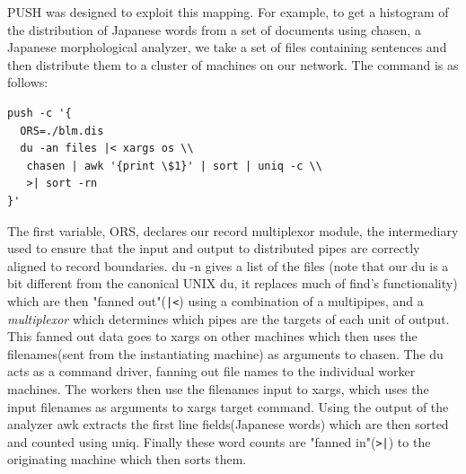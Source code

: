 PUSH was designed to exploit this mapping. For example, to get a histogram of 
the distribution of Japanese words from a set of documents using chasen, 
a Japanese morphological analyzer, we take a set of files containing sentences 
and then distribute them to a cluster of machines on our network. The command 
is as follows:

\begin{verbatim}
push -c '{
  ORS=./blm.dis
  du -an files |< xargs os \\
   chasen | awk '{print \$1}' | sort | uniq -c \\
   >| sort -rn
}'
\end{verbatim}

The first variable, ORS, declares our record multiplexor module, the intermediary 
used to ensure that the input and output to distributed pipes are correctly 
aligned to record boundaries. du -n gives a list of the files (note that our 
du is a bit different from the canonical UNIX du, it replaces much of find's 
functionality) which are then "fanned out"(\verb!|<!) using a combination 
of a multipipes, and a \emph{multiplexor} 
which determines which pipes are the targets of each unit of output.  
This fanned out data goes to xargs on other machines which 
then uses the filenames(sent from the instantiating machine) as arguments to 
chasen. The du acts as a command driver, fanning out file names to the 
individual worker machines. The workers then use the filenames input to 
xargs, which uses the input filenames as arguments to xargs target command. 
Using the output of the analyzer awk extracts the first line fields(Japanese 
words) which are then sorted and counted using uniq.  Finally these word 
counts are "fanned in"(\verb!>|!) to the originating machine which then 
sorts them. 

